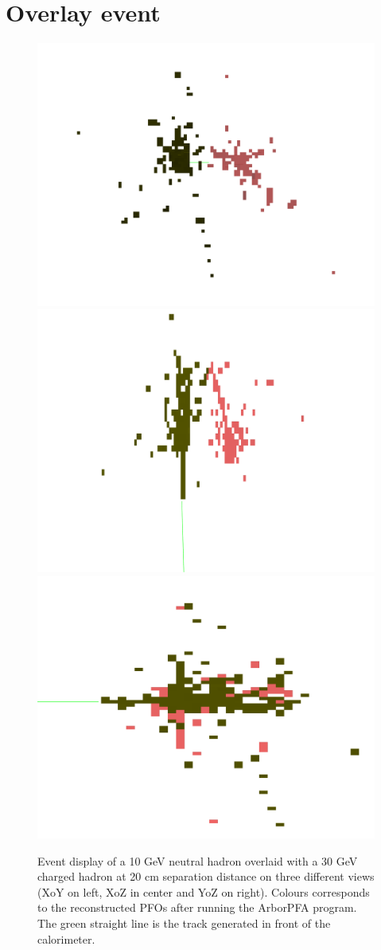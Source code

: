 \documentclass[cits]{JINST}
\begin{document}
\newpage
\section{Overlay event}

\begin{figure}[!h]
  \begin{center}
    \includegraphics[width=0.32\linewidth]{ArborPFA_PandoraMonitoring_SDHCAL_Overlay_XY.pdf}
    \includegraphics[width=0.32\linewidth]{ArborPFA_PandoraMonitoring_SDHCAL_Overlay_XZ.pdf}
    \includegraphics[width=0.32\linewidth]{ArborPFA_PandoraMonitoring_SDHCAL_Overlay_YZ.pdf}
  \end{center}
  \caption{\label{OVERLAY_EVENT_DISPLAY} Event display of a 10 GeV neutral hadron overlaid with a 30 GeV charged hadron at 20 cm separation distance on three different views (XoY on left, XoZ in center and YoZ on right). Colours corresponds to the reconstructed PFOs after running the ArborPFA program. The green straight line is the track generated in front of the calorimeter.}
\end{figure}
\end{document}
